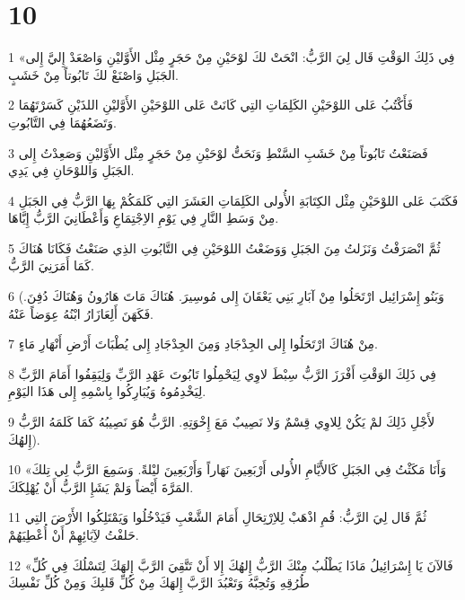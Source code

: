\chapter{10}

\par 1 «فِي ذَلِكَ الوَقْتِ قَال لِيَ الرَّبُّ: انْحَتْ لكَ لوْحَيْنِ مِنْ حَجَرٍ مِثْل الأَوَّليْنِ وَاصْعَدْ إِليَّ إِلى الجَبَلِ وَاصْنَعْ لكَ تَابُوتاً مِنْ خَشَبٍ.
\par 2 فَأَكْتُبُ عَلى اللوْحَيْنِ الكَلِمَاتِ التِي كَانَتْ عَلى اللوْحَيْنِ الأَوَّليْنِ اللذَيْنِ كَسَرْتَهُمَا وَتَضَعُهُمَا فِي التَّابُوتِ.
\par 3 فَصَنَعْتُ تَابُوتاً مِنْ خَشَبِ السَّنْطِ وَنَحَتُّ لوْحَيْنِ مِنْ حَجَرٍ مِثْل الأَوَّليْنِ وَصَعِدْتُ إِلى الجَبَلِ وَاللوْحَانِ فِي يَدِي.
\par 4 فَكَتَبَ عَلى اللوْحَيْنِ مِثْل الكِتَابَةِ الأُولى الكَلِمَاتِ العَشَرَ التِي كَلمَكُمْ بِهَا الرَّبُّ فِي الجَبَلِ مِنْ وَسَطِ النَّارِ فِي يَوْمِ الاِجْتِمَاعِ وَأَعْطَانِيَ الرَّبُّ إِيَّاهَا.
\par 5 ثُمَّ انْصَرَفْتُ وَنَزَلتُ مِنَ الجَبَلِ وَوَضَعْتُ اللوْحَيْنِ فِي التَّابُوتِ الذِي صَنَعْتُ فَكَانَا هُنَاكَ كَمَا أَمَرَنِيَ الرَّبُّ.
\par 6 (وَبَنُو إِسْرَائِيل ارْتَحَلُوا مِنْ آبَارِ بَنِي يَعْقَانَ إِلى مُوسِيرَ. هُنَاكَ مَاتَ هَارُونُ وَهُنَاكَ دُفِنَ. فَكَهَنَ أَلِعَازَارُ ابْنُهُ عِوَضاً عَنْهُ.
\par 7 مِنْ هُنَاكَ ارْتَحَلُوا إِلى الجِدْجَادِ وَمِنَ الجِدْجَادِ إِلى يُطْبَاتَ أَرْضِ أَنْهَارِ مَاءٍ.
\par 8 فِي ذَلِكَ الوَقْتِ أَفْرَزَ الرَّبُّ سِبْطَ لاوِي لِيَحْمِلُوا تَابُوتَ عَهْدِ الرَّبِّ وَلِيَقِفُوا أَمَامَ الرَّبِّ لِيَخْدِمُوهُ وَيُبَارِكُوا بِاسْمِهِ إِلى هَذَا اليَوْمِ.
\par 9 لأَجْلِ ذَلِكَ لمْ يَكُنْ لِلاوِي قِسْمٌ وَلا نَصِيبٌ مَعَ إِخْوَتِهِ. الرَّبُّ هُوَ نَصِيبُهُ كَمَا كَلمَهُ الرَّبُّ إِلهُكَ).
\par 10 «وَأَنَا مَكَثْتُ فِي الجَبَلِ كَالأَيَّامِ الأُولى أَرْبَعِينَ نَهَاراً وَأَرْبَعِينَ ليْلةً. وَسَمِعَ الرَّبُّ لِي تِلكَ المَرَّةَ أَيْضاً وَلمْ يَشَإِ الرَّبُّ أَنْ يُهْلِكَكَ.
\par 11 ثُمَّ قَال لِيَ الرَّبُّ: قُمِ اذْهَبْ لِلاِرْتِحَالِ أَمَامَ الشَّعْبِ فَيَدْخُلُوا وَيَمْتَلِكُوا الأَرْضَ التِي حَلفْتُ لآِبَائِهِمْ أَنْ أُعْطِيَهُمْ.
\par 12 «فَالآنَ يَا إِسْرَائِيلُ مَاذَا يَطْلُبُ مِنْكَ الرَّبُّ إِلهُكَ إِلا أَنْ تَتَّقِيَ الرَّبَّ إِلهَكَ لِتَسْلُكَ فِي كُلِّ طُرُقِهِ وَتُحِبَّهُ وَتَعْبُدَ الرَّبَّ إِلهَكَ مِنْ كُلِّ قَلبِكَ وَمِنْ كُلِّ نَفْسِكَ
